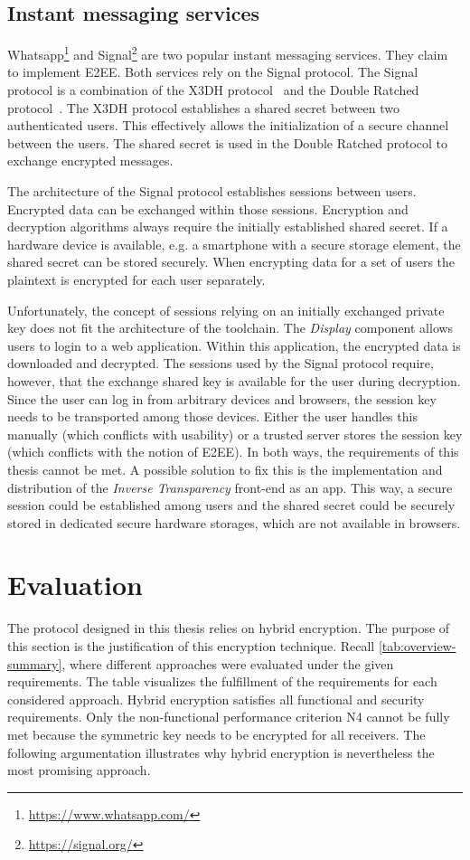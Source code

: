 \documentclass[../main.tex]{subfiles}
\begin{document}
\subsection{Instant messaging services}
Whatsapp\footnote{\url{https://www.whatsapp.com/}} and Signal\footnote{\url{https://signal.org/}} are two popular instant messaging services.
They claim to implement E2EE.
Both services rely on the Signal protocol.
The Signal protocol is a combination of the X3DH protocol~\cite{Marlinspike2016} and the Double Ratched protocol~\cite{Perrin2016}.
The X3DH protocol establishes a shared secret between two authenticated users.
This effectively allows the initialization of a secure channel between the users.
The shared secret is used in the Double Ratched protocol to exchange encrypted messages.~\cite{Marlinspike2016, Perrin2016}

The architecture of the Signal protocol establishes sessions between users.
Encrypted data can be exchanged within those sessions.
Encryption and decryption algorithms always require the initially established shared secret.
If a hardware device is available, e.g. a smartphone with a secure storage element, the shared secret can be stored securely. 
When encrypting data for a set of users the plaintext is encrypted for each user separately.~\cite{Marlinspike2014}

Unfortunately, the concept of sessions relying on an initially exchanged private key does not fit the architecture of the toolchain.
The \emph{Display} component allows users to login to a web application.
Within this application, the encrypted data is downloaded and decrypted.
The sessions used by the Signal protocol require, however, that the exchange shared key is available for the user during decryption.
Since the user can log in from arbitrary devices and browsers, the session key needs to be transported among those devices.
Either the user handles this manually (which conflicts with usability) or a trusted server stores the session key (which conflicts with the notion of E2EE).
In both ways, the requirements of this thesis cannot be met.
A possible solution to fix this is the implementation and distribution of the \emph{Inverse Transparency} front-end as an app.
This way, a secure session could be established among users and the shared secret could be securely stored in dedicated secure hardware storages, which are not available in browsers.

\section{Evaluation}
\label{sec:justification}
The protocol designed in this thesis relies on hybrid encryption.
The purpose of this section is the justification of this encryption technique.
Recall \cref{tab:overview-summary}, where different approaches were evaluated under the given requirements.
The table visualizes the fulfillment of the requirements for each considered approach.
Hybrid encryption satisfies all functional and security requirements.
Only the non-functional performance criterion N4 cannot be fully met because the symmetric key needs to be encrypted for all receivers.
The following argumentation illustrates why hybrid encryption is nevertheless the most promising approach.
\end{document}
